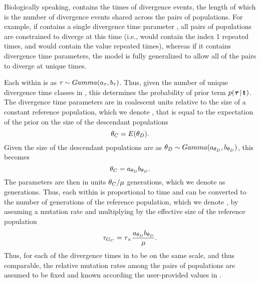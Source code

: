 \documentclass[letterpaper,12pt]{article}
\begin{document}
\begin{linenumbers}
Biologically speaking, \divTimeVector contains the times of divergence events,
the length of which \divTimeNum is the number of divergence events shared across
the \npairs{} pairs of populations.
For example, if \divTimeVector contains a single divergence time parameter
, all \npairs{} pairs of populations are constrained to diverge at
this time (i.e., \divTimeIndexVector would contain the index 1 repeated
\npairs{} times, and \divTimeMapVector would contain the value 
repeated \npairs{} times), whereas if it contains \npairs{} divergence time
parameters, the model is fully generalized to allow all of the pairs to diverge
at unique times.

\begin{linenomath}
Each \divTime{} within \divTimeVector is \iid as $\tau_{} \sim
Gamma(a_{\tau_{}}, b_{\tau_{}})$.
Thus, given the number of unique divergence time classes in
\divTimeIndexVector, this determines the probability of prior term
$p(\boldsymbol{\tau_{}} \,|\, \mathbf{t_{}})$.
The divergence time parameters are in coalescent units relative to the size of
a constant reference population, which we denote , that is equal to
the expectation of the prior on the size of the descendant populations
\begin{equation}
    \myTheta{C} = E(\descendantTheta{}{}).
    \label{eq:thetaC}
\end{equation}
Given the size of the descendant populations are \iid as
$\descendantTheta{}{} \sim Gamma(\gammaShape{\descendantTheta{}{}},
\gammaScale{\descendantTheta{}{}})$,
this becomes
\begin{equation}
    \myTheta{C} = \gammaShape{\descendantTheta{}{}}\gammaScale{\descendantTheta{}{}}.
    \label{eq:thetaCGamma}
\end{equation}
The \divTime{} parameters are then in units $\theta_{C}/\mu$
generations, which we denote as \globalcoalunit generations.
Thus, each \divTime{} within \divTimeVector is proportional to time and can be
converted to the number of generations of the reference population, which we
denote , by assuming a mutation rate and multiplying by the
effective size of the reference population
\begin{equation}
    \divTime{G_C} = \divTime \times \frac{
        \gammaShape{\descendantTheta{}{}}\gammaScale{\descendantTheta{}{}}}
        {\mutationRate}.
    \label{eq:divTimeGenerations}
\end{equation}
Thus, for each of the divergence times in \divTimeVector to be on the same
scale, and thus comparable, the relative mutation rates among the pairs of
populations are assumed to be fixed and known according the user-provided
values in \mutationRateScalarConstantVector.
\end{linenomath}


\end{linenumbers}
\end{document}
